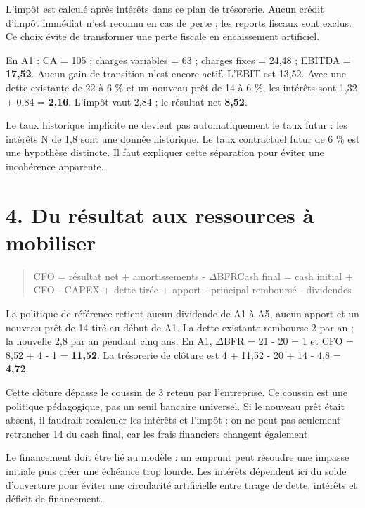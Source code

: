\documentclass[12pt,a4paper]{article}
\begin{document}
L’impôt est calculé après intérêts dans ce plan de trésorerie. Aucun crédit d’impôt immédiat n’est reconnu en cas de perte ; les reports fiscaux sont exclus. Ce choix évite de transformer une perte fiscale en encaissement artificiel.


En A1 : CA = 105 ; charges variables = 63 ; charges fixes = 24,48 ; EBITDA = \textbf{17,52}. Aucun gain de transition n’est encore actif. L’EBIT est 13,52. Avec une dette existante de 22 à 6 \% et un nouveau prêt de 14 à 6 \%, les intérêts sont 1,32 + 0,84 = \textbf{2,16}. L’impôt vaut 2,84 ; le résultat net \textbf{8,52}.


Le taux historique implicite ne devient pas automatiquement le taux futur : les intérêts N de 1,8 sont une donnée historique. Le taux contractuel futur de 6 \% est une hypothèse distincte. Il faut expliquer cette séparation pour éviter une incohérence apparente.

\section*{4. Du résultat aux ressources à mobiliser}

\begin{quote}\small CFO = résultat net + amortissements - $\Delta$BFR\newline Cash final = cash initial + CFO - CAPEX + dette tirée + apport - principal remboursé - dividendes\end{quote}

La politique de référence retient aucun dividende de A1 à A5, aucun apport et un nouveau prêt de 14 tiré au début de A1. La dette existante rembourse 2 par an ; la nouvelle 2,8 par an pendant cinq ans. En A1, $\Delta$BFR = 21 - 20 = 1 et CFO = 8,52 + 4 - 1 = \textbf{11,52}. La trésorerie de clôture est 4 + 11,52 - 20 + 14 - 4,8 = \textbf{4,72}.


Cette clôture dépasse le coussin de 3 retenu par l’entreprise. Ce coussin est une politique pédagogique, pas un seuil bancaire universel. Si le nouveau prêt était absent, il faudrait recalculer les intérêts et l’impôt : on ne peut pas seulement retrancher 14 du cash final, car les frais financiers changent également.


Le financement doit être lié au modèle : un emprunt peut résoudre une impasse initiale puis créer une échéance trop lourde. Les intérêts dépendent ici du solde d’ouverture pour éviter une circularité artificielle entre tirage de dette, intérêts et déficit de financement.
\end{document}
